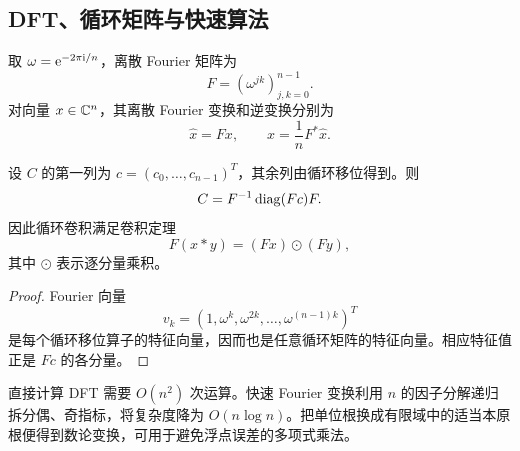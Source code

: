 \subsection{DFT、循环矩阵与快速算法}

取 $\omega=\mathrm e^{-2\pi\mathrm i/n}$，离散 Fourier 矩阵为
\begin{equation}
 F=(\omega^{jk})_{j,k=0}^{n-1}.
\end{equation}
对向量 $x\in\mathbb C^n$，其离散 Fourier 变换和逆变换分别为
\begin{equation}
 \widehat{x}=Fx,
 \qquad
 x=\frac1nF^*\widehat{x}.
\end{equation}

\begin{theorem}[循环矩阵的对角化]
设 $C$ 的第一列为 $c=(c_0,\ldots,c_{n-1})^T$，其余列由循环移位得到。则
\begin{equation}
 C=F^{-1}\operatorname{diag}(Fc)F.
\end{equation}
因此循环卷积满足卷积定理
\begin{equation}
 F(x\ast y)=(Fx)\odot(Fy),
\end{equation}
其中 $\odot$ 表示逐分量乘积。
\end{theorem}

\begin{proof}
Fourier 向量
\begin{equation}
 v_k=(1,\omega^k,\omega^{2k},\ldots,\omega^{(n-1)k})^T
\end{equation}
是每个循环移位算子的特征向量，因而也是任意循环矩阵的特征向量。相应特征值正是 $Fc$ 的各分量。
\end{proof}

\begin{remark}
直接计算 DFT 需要 $O(n^2)$ 次运算。快速 Fourier 变换利用 $n$ 的因子分解递归拆分偶、奇指标，将复杂度降为 $O(n\log n)$。把单位根换成有限域中的适当本原根便得到数论变换，可用于避免浮点误差的多项式乘法。
\end{remark}

